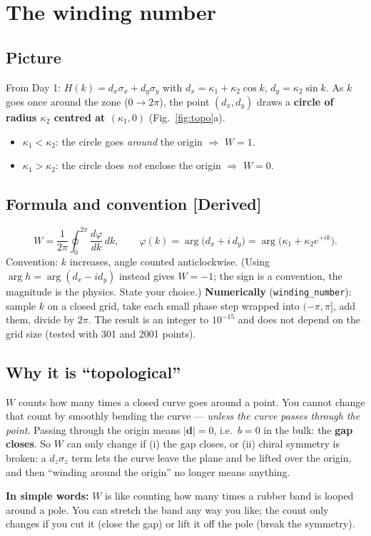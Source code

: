 \documentclass[10pt,a4paper]{article}
\newcommand{\ka}{\kappa_1}
\newcommand{\kc}{\kappa_2}
\newcommand{\evd}[1]{\textsf{\small[#1]}}
\newcommand{\simple}[1]{\par\noindent\textbf{In simple words:} #1\par\smallskip}
\begin{document}
\section{The winding number}
\subsection{Picture}
From Day 1: $H(k)=d_x\sigma_x+d_y\sigma_y$ with $d_x=\ka+\kc\cos k$, $d_y=\kc\sin k$. As $k$ goes once around the zone ($0\to2\pi$), the point $(d_x,d_y)$ draws a \textbf{circle of radius $\kc$ centred at $(\ka,0)$} (Fig.~\ref{fig:topo}a).
\begin{itemize}[itemsep=1pt]
\item $\ka<\kc$: the circle goes \emph{around} the origin $\Rightarrow$ $W=1$.
\item $\ka>\kc$: the circle does \emph{not} enclose the origin $\Rightarrow$ $W=0$.
\end{itemize}

\subsection{Formula and convention \evd{Derived}}
\[
W=\frac{1}{2\pi}\oint_{0}^{2\pi}\frac{d\varphi}{dk}\,dk,\qquad \varphi(k)=\arg\big(d_x+i\,d_y\big)=\arg\big(\ka+\kc e^{+ik}\big).
\]
Convention: $k$ increases, angle counted anticlockwise. (Using $\arg h=\arg(d_x-id_y)$ instead gives $W=-1$; the sign is a convention, the magnitude is the physics. State your choice.)
\textbf{Numerically} (\texttt{winding\_number}): sample $k$ on a closed grid, take each small phase step wrapped into $(-\pi,\pi]$, add them, divide by $2\pi$. The result is an integer to $10^{-15}$ and does not depend on the grid size (tested with 301 and 2001 points).

\subsection{Why it is ``topological''}
$W$ counts how many times a closed curve goes around a point. You cannot change that count by smoothly bending the curve --- \emph{unless the curve passes through the point}. Passing through the origin means $|\bm d|=0$, i.e.\ $b=0$ in the bulk: the \textbf{gap closes}. So $W$ can only change if (i) the gap closes, or (ii) chiral symmetry is broken: a $d_z\sigma_z$ term lets the curve leave the plane and be lifted over the origin, and then ``winding around the origin'' no longer means anything.
\simple{$W$ is like counting how many times a rubber band is looped around a pole. You can stretch the band any way you like; the count only changes if you cut it (close the gap) or lift it off the pole (break the symmetry).}
\end{document}
